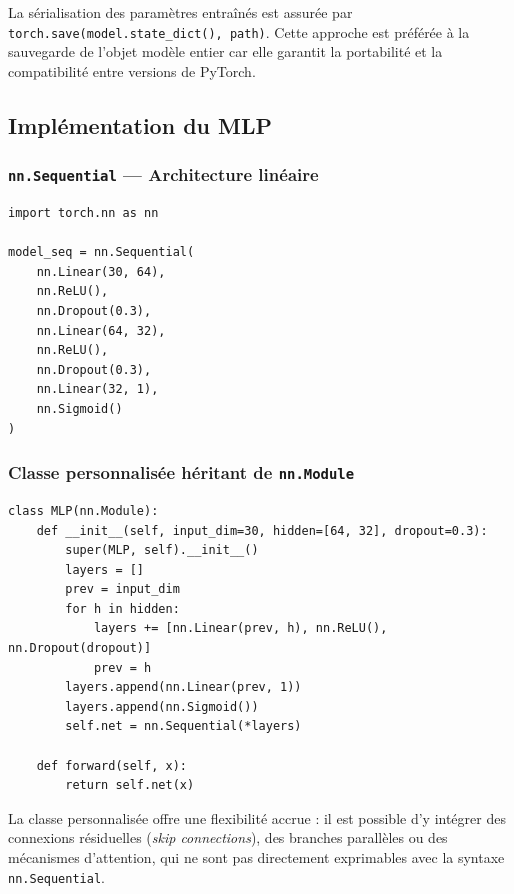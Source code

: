 \documentclass[11pt,a4paper]{article}
\begin{document}
La sérialisation des paramètres entraînés est assurée par \texttt{torch.save(model.state\_dict(), path)}.
Cette approche est préférée à la sauvegarde de l'objet modèle entier car elle garantit
la portabilité et la compatibilité entre versions de PyTorch.

\subsection{Implémentation du MLP}

\subsubsection{\texttt{nn.Sequential} — Architecture linéaire}

\begin{lstlisting}[caption={MLP défini avec \texttt{nn.Sequential}.},
                   label={lst:mlp_sequential}]
import torch.nn as nn

model_seq = nn.Sequential(
    nn.Linear(30, 64),
    nn.ReLU(),
    nn.Dropout(0.3),
    nn.Linear(64, 32),
    nn.ReLU(),
    nn.Dropout(0.3),
    nn.Linear(32, 1),
    nn.Sigmoid()
)
\end{lstlisting}

\subsubsection{Classe personnalisée héritant de \texttt{nn.Module}}

\begin{lstlisting}[caption={MLP défini comme classe héritant de \texttt{nn.Module}.},
                   label={lst:mlp_class}]
class MLP(nn.Module):
    def __init__(self, input_dim=30, hidden=[64, 32], dropout=0.3):
        super(MLP, self).__init__()
        layers = []
        prev = input_dim
        for h in hidden:
            layers += [nn.Linear(prev, h), nn.ReLU(), nn.Dropout(dropout)]
            prev = h
        layers.append(nn.Linear(prev, 1))
        layers.append(nn.Sigmoid())
        self.net = nn.Sequential(*layers)

    def forward(self, x):
        return self.net(x)
\end{lstlisting}

La classe personnalisée offre une flexibilité accrue : il est possible d'y intégrer
des connexions résiduelles (\textit{skip connections}), des branches parallèles ou
des mécanismes d'attention, qui ne sont pas directement exprimables avec la syntaxe
\texttt{nn.Sequential}.
\end{document}
